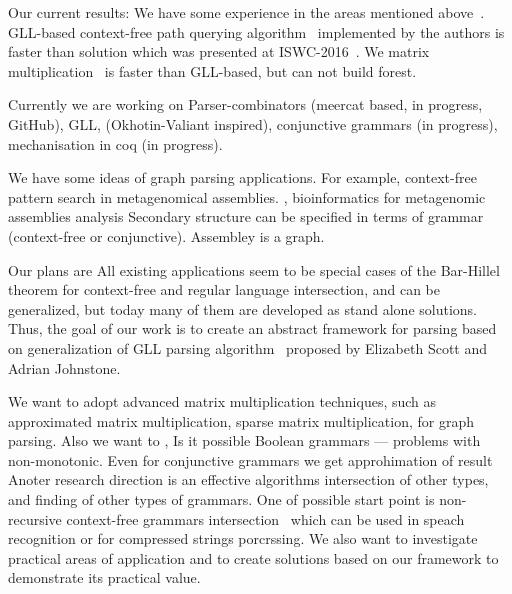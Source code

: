 \documentclass{vldb}
\begin{document}
Our current results: We have some experience in the areas mentioned above~\cite{GraphGLL, RelaxedRNGLR}.
GLL-based context-free path querying algorithm~\cite{GraphGLL} implemented by the authors is faster than solution which was presented at ISWC-2016~\cite{CFRDFParsing}. 
We matrix multiplication~\cite{GraphParsingMatrix} is faster than GLL-based, but can not build forest.

Currently we are working on
Parser-combinators (meercat based, in progress, GitHub), GLL,  (Okhotin-Valiant inspired), conjunctive grammars (in progress), mechanisation in coq (in progress).

We have some ideas of graph parsing applications.
For example, context-free pattern search in metagenomical assemblies.  , bioinformatics for metagenomic assemblies analysis
Secondary structure can be specified in terms of grammar (context-free or conjunctive).
Assembley is a graph.

Our plans are 
All existing applications seem to be special cases of the Bar-Hillel~\cite{Bar-Hillel} theorem for context-free and regular language intersection, and can be generalized, but today many of them are developed as stand alone solutions.
Thus, the goal of our work is to create an abstract framework for parsing based on generalization of GLL parsing algorithm~\cite{GLL} proposed by Elizabeth Scott and Adrian Johnstone. 

We want to adopt advanced matrix multiplication techniques, such as approximated matrix multiplication, sparse matrix multiplication, for graph parsing.
Also we want to , Is it possible Boolean grammars --- problems with non-monotonic. Even for conjunctive grammars we get approhimation of result
Anoter research direction is an effective algorithms intersection of other types, and finding of other types of grammars.
One of possible start point is non-recursive context-free grammars intersection~\cite{Nederhof1, Nederhof2} which can be used in speach recognition or for compressed strings porcrssing. 
We also want to investigate practical areas of application and to create solutions based on our framework to demonstrate its practical value.
\end{document}

